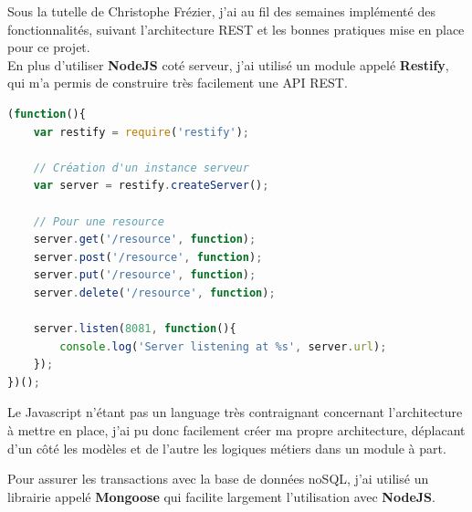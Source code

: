 \documentclass{report}
\newcommand{\jumpOne}{\\[1\baselineskip]}
\begin{document}
Sous la tutelle de Christophe Frézier, j'ai au fil des semaines implémenté des fonctionnalités, suivant l'architecture \gls{REST} et les bonnes pratiques mise en place pour ce projet. 
\jumpOne
En plus d'utiliser \textbf{NodeJS} coté serveur, j'ai utilisé un module appelé \textbf{Restify}, qui m'a permis de construire très facilement une \gls{API} \gls{REST}.   
\begin{lstlisting}[language=javascript, caption=Exemple d'utilisation avec restify]
(function(){
	var restify = require('restify');

	// Création d'un instance serveur
	var server = restify.createServer();

	// Pour une resource
	server.get('/resource', function);
	server.post('/resource', function);
	server.put('/resource', function);
	server.delete('/resource', function);

	server.listen(8081, function(){
		console.log('Server listening at %s', server.url);
	});
})();
\end{lstlisting}

Le Javascript n'étant pas un language très contraignant concernant l'architecture à mettre en place, j'ai pu donc facilement créer ma propre architecture, déplacant d'un côté les modèles et de l'autre les logiques métiers dans un module à part. 


\newpage



Pour assurer les transactions avec la base de données noSQL, j'ai utilisé un librairie appelé \textbf{Mongoose} qui facilite largement l'utilisation avec \textbf{NodeJS}.
\end{document}

